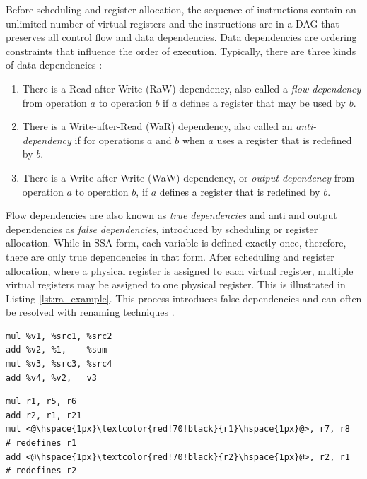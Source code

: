 Before scheduling and register allocation, the sequence of instructions contain an unlimited number of virtual registers and the instructions are in a DAG that preserves all control flow and data dependencies. Data dependencies are ordering constraints that influence the order of execution. Typically, there are three kinds of data dependencies \cite{data_dependece}:
\begin{enumerate}
\item There is a Read-after-Write (RaW) dependency, also called a \emph{flow dependency} from operation $a$ to operation $b$ if $a$ defines a register that may be used by $b$.
\item  There is a Write-after-Read (WaR) dependency, also called an \emph{anti-dependency} if for operations $a$ and $b$ when $a$ uses a register that is redefined by $b$. 
\item There is a Write-after-Write (WaW) dependency, or \emph{output dependency} from operation $a$ to operation $b$, if $a$ defines a register that is redefined by $b$.
\end{enumerate} 

Flow dependencies are also known as \emph{true dependencies} and anti and output dependencies as \emph{false dependencies}, introduced by scheduling or register allocation. While in SSA form, each variable is defined exactly once, therefore, there are only true dependencies in that form. After scheduling and register allocation, where a physical register is assigned to each virtual register, multiple virtual registers may be assigned to one physical register. This is illustrated in Listing \ref{lst:ra_example}. This process introduces false dependencies and can often be resolved with renaming techniques \cite{tta_codegen,renaming}.

\begin{center}
\hspace{2px}\begin{minipage}[t]{.475\textwidth}
\begin{lstlisting}[frame=tlrb]
mul %v1, %src1, %src2
add %v2, %1,    %sum
mul %v3, %src3, %src4
add %v4, %v2,   v3
\end{lstlisting}
\end{minipage}\hfill
\begin{minipage}[t]{.475\textwidth}
\begin{lstlisting}[frame=tlrb]
mul r1, r5, r6
add r2, r1, r21
mul <@\hspace{1px}\textcolor{red!70!black}{r1}\hspace{1px}@>, r7, r8  # redefines r1
add <@\hspace{1px}\textcolor{red!70!black}{r2}\hspace{1px}@>, r2, r1  # redefines r2
\end{lstlisting}
\end{minipage}
\label{lst:ra_example}
\end{center}

